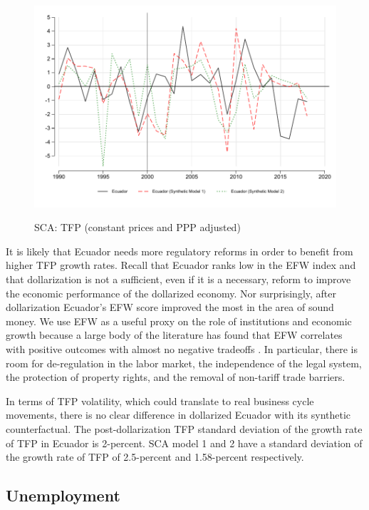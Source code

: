 \documentclass[12pt]{article}
\begin{document}


\begin{figure}[!h]
    \caption{SCA: TFP (constant prices and PPP adjusted)}
    \centering
    \includegraphics{STATA/Fig_TFP3_SCA.pdf}
    \label{fig:SCA_TFP}
\end{figure}

It is likely that Ecuador needs more regulatory reforms in order to benefit from higher TFP growth rates. Recall that Ecuador ranks low in the EFW index and that dollarization is not a sufficient, even if it is a necessary, reform to improve the economic performance of the dollarized economy. Nor surprisingly, after dollarization Ecuador's EFW score improved the most in the area of sound money. We use EFW as a useful proxy on the role of institutions and economic growth because a large body of the literature has found that EFW correlates with positive outcomes with almost no negative tradeoffs \parencite{Hall2014}. In particular, there is room for de-regulation in the labor market, the independence of the legal system, the protection of property rights, and the removal of non-tariff trade barriers. 

In terms of TFP volatility, which could translate to real business cycle movements, there is no clear difference in dollarized Ecuador with its synthetic counterfactual. The post-dollarization TFP standard deviation of the growth rate of TFP in Ecuador is 2-percent. SCA model 1 and 2 have a standard deviation of the growth rate of TFP of 2.5-percent and 1.58-percent respectively.

\subsection{Unemployment}
\end{document}
